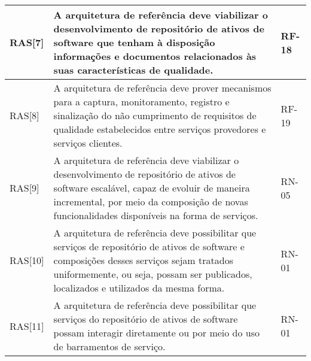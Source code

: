 \begin{longtable}{ | l | p{9cm} | p{3cm} |}
    RAS[7] 
    & A arquitetura de referência deve viabilizar o desenvolvimento  de repositório de ativos de software que tenham à disposição  informações e documentos relacionados às suas características  de qualidade. 
    & RF-18
    \\ \hline 

    RAS[8] 
    & A arquitetura de referência deve prover mecanismos para a  captura, monitoramento, registro e sinalização do não  cumprimento de requisitos de qualidade estabelecidos entre  serviços provedores e serviços clientes. 
    & RF-19
    \\ \hline 
    RAS[9] 
	& A arquitetura de referência deve viabilizar o desenvolvimento
	de repositório de ativos de software escalável, capaz de evoluir 
	de maneira incremental, por meio da composição de novas 
	funcionalidades disponíveis na forma de serviços. 
	& RN-05
	\\ \hline 

	RAS[10] 
	& A arquitetura de referência deve possibilitar que serviços de  repositório de ativos de software e composições desses  serviços sejam tratados uniformemente, ou seja, possam ser  publicados, localizados e utilizados da mesma forma. 
	& RN-01
	\\ \hline 

	RAS[11] 
	& A arquitetura de referência deve possibilitar que serviços do  repositório de ativos de software possam interagir diretamente  ou por meio do uso de barramentos de serviço. 
	& RN-01
	\\ \hline 

\end{longtable}